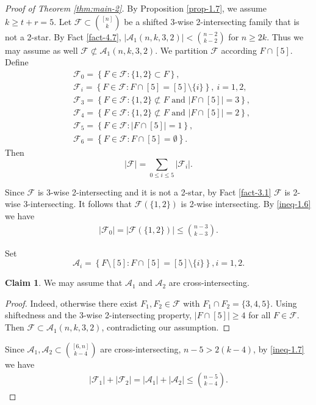 \documentclass[11pt,a4paper]{article}
\newtheorem{false statement}{False statement}
\theoremstyle{definition}
\newtheorem{claim}[thm]{Claim}
\def\hf{\mathcal{F}}
\def\ha{\mathcal{A}}
\begin{document}
\begin{proof}[Proof of Theorem \ref{thm:main-2}]
By Proposition \ref{prop-1.7}, we assume $k\geq t+r=5$. Let $\hf\subset \binom{[n]}{k}$ be a shifted 3-wise 2-intersecting family that is not a 2-star. By Fact \ref{fact-4.7}, $|\ha_1(n,k,3,2)|<\binom{n-2}{k-2}$ for $n\geq 2k$. Thus we may assume as  well $\hf\not\subset \ha_1(n,k,3,2)$.  We partition $\hf$ according $F\cap [5]$. Define
\begin{align*}
&\hf_0 =\left\{F\in \hf\colon \{1,2\}\subset F\right\},\\[2pt]
&\hf_i= \left\{F\in  \hf\colon F\cap [5] =[5]\setminus \{i\}\right\},\ i=1,2,\\[3pt]
&\hf_3= \left\{F\in \hf\colon \{1,2\}\not\subset F \mbox{ and } |F\cap [5]|=3\right\},\\[3pt]
&\hf_4= \left\{F\in \hf\colon \{1,2\}\not\subset F \mbox{ and } |F\cap [5]|=2\right\},\\[3pt]
&\hf_5=\left\{F\in \hf\colon |F\cap [5]|=1\right\},\\[3pt]
&\hf_6=\left\{F\in \hf\colon F\cap[5]=\emptyset\right\}.
\end{align*}
Then
\[
|\hf| =\sum_{0\leq i\leq 5} |\hf_i|.
\]

Since $\hf$ is 3-wise 2-intersecting and it is not a 2-star, by Fact \ref{fact-3.1} $\hf$ is 2-wise 3-intersecting. It follows that $\hf(\{1,2\})$ is 2-wise intersecting. By \eqref{ineq-1.6} we have
\begin{align}\label{ineq-hf0}
|\hf_0| =|\hf(\{1,2\})| \leq \binom{n-3}{k-3}.
\end{align}

Set
\[
\ha_i=\left\{F\setminus [5]\colon F\cap [5]=[5]\setminus \{i\}\right\}, i=1,2.
\]
\begin{claim}\label{claim-5.11}
We may assume  that $\ha_1$ and $\ha_2$ are cross-intersecting.
\end{claim}
\begin{proof}
Indeed, otherwise there exist $F_1,F_2\in \hf$ with $F_1\cap F_2=\{3,4,5\}$. Using shiftedness and the 3-wise 2-intersecting property, $|F\cap [5]|\geq 4$ for all $F\in \hf$. Then $\hf\subset \ha_1(n,k,3,2)$, contradicting our assumption.
\end{proof}

Since $\ha_1,\ha_2\subset \binom{[6,n]}{k-4}$ are cross-intersecting, $n-5>2(k-4)$, by \eqref{ineq-1.7} we have 
\begin{align}\label{ineq-hf12}
|\hf_1|+|\hf_2|=|\ha_1|+|\ha_2| \leq \binom{n-5}{k-4}.
\end{align}


\end{proof}
\end{document}
